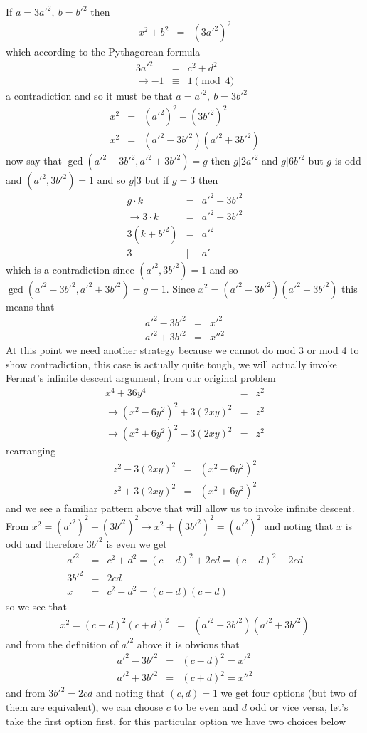 \documentclass[aps,preprint,preprintnumbers,nofootinbib,showpacs,prd]{revtex4-1}
\newcommand{\nbea}{\begin{eqnarray*}}
\newcommand{\neea}{\end{eqnarray*}}
\begin{document}
If $a = 3{a'}^2, ~b={b'}^2$ then
%
\nbea
x^2 + b^2 & = & (3 {a'}^2)^2
\neea
%
which according to the Pythagorean formula
%
\nbea
3{a'}^2 & = & c^2 + d^2 \\
\to -1 & \equiv & 1 \pmod{4}
\neea
%
a contradiction and so it must be that $a = {a'}^2, ~b=3{b'}^2$
%
\nbea
x^2 & = & ({a'}^2)^2 - ({3{b'}}^2)^2\\
x^2 & = &  ({a'}^2 - {3{b'}}^2)({a'}^2 + {3{b'}}^2)
\neea
%
now say that $\gcd({a'}^2 - {3{b'}}^2,{a'}^2 + {3{b'}}^2) = g$ then $g|2{a'}^2$ and $g|6{b'}^2$ but $g$ is odd and $({a'}^2,3{b'}^2)=1$ and so $g|3$ but if $g=3$ then
%
\nbea
g\cdot k & = & {a'}^2 - 3{b'}^2 \\
\to 3\cdot k & = & {a'}^2 - 3{b'}^2 \\
3(k + {b'}^2) & = & {a'}^2 \\
3 &|& a'
\neea
%
which is a contradiction since $({a'}^2,3{b'}^2)=1$ and so $\gcd({a'}^2 - {3{b'}}^2,{a'}^2 + {3{b'}}^2) = g = 1$. Since $x^2 = ({a'}^2 - {3{b'}}^2)({a'}^2 + {3{b'}}^2)$ this means that
%
\nbea
{a'}^2 - {3{b'}}^2 & = & {x'}^2 \\
{a'}^2 + {3{b'}}^2 & = & {x''}^2
\neea
%
At this point we need another strategy because we cannot do mod 3 or mod 4 to show contradiction, this case is actually quite tough, we will actually invoke Fermat's infinite descent argument, from our original problem
%
\nbea
x^4 + 36y^4 & = & z^2 \\
\to (x^2 - 6y^2)^2 + 3(2xy)^2 & = & z^2 \\
\to (x^2 + 6y^2)^2 - 3(2xy)^2 & = & z^2
\neea
%
rearranging
%
\nbea
z^2 - 3(2xy)^2 & = & (x^2 - 6y^2)^2 \\
z^2 + 3(2xy)^2 & = & (x^2 + 6y^2)^2
\neea
%
and we see a familiar pattern above that will allow us to invoke infinite descent. From $x^2 = ({a'}^2)^2 - ({3{b'}}^2)^2 \to x^2 + ({3{b'}}^2)^2 = ({a'}^2)^2$ and noting that $x$ is odd and therefore ${3{b'}}^2$ is even we get
%
\nbea
{a'}^2 & = & c^2 + d^2  = (c-d)^2 + 2cd = (c+d)^2 - 2cd\\
3{b'}^2 & = & 2cd \\
x & = & c^2 - d^2 = (c-d)(c+d)
\neea
%
so we see that
%
\nbea
x^2 = (c-d)^2(c+d)^2 & = & ({a'}^2 - {3{b'}}^2)({a'}^2 + {3{b'}}^2)
\neea
%
and from the definition of ${a'}^2$ above it is obvious that
%
\nbea
{a'}^2 - {3{b'}}^2 & = & (c-d)^2 = {x'}^2 \\
{a'}^2 + {3{b'}}^2 & = & (c+d)^2 = {x''}^2
\neea
%
and from $3{b'}^2 = 2cd$ and noting that $(c,d)=1$ we get four options (but two of them are equivalent), we can choose $c$ to be even and $d$ odd or vice versa, let's take the first option first, for this particular option we have two choices below
\end{document}

